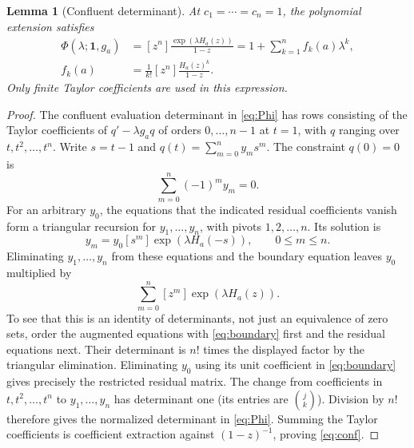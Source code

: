 \documentclass[11pt]{article}
\newtheorem{lemma}[theorem]{Lemma}
\theoremstyle{remark}\newtheorem{remark}[theorem]{Remark}
\newcommand{\coef}[2]{[#1^{#2}]}
\begin{document}
\begin{lemma}[Confluent determinant]\label{lem:confluent}
At $c_1=\cdots=c_n=1$, the polynomial extension satisfies
\begin{align}\label{eq:conf}
 \Phi(\lambda;\mathbf1,g_a)
 &=\coef{z}{n}\frac{\exp(\lambda H_a(z))}{1-z}
 =1+\sum_{k=1}^n f_k(a)\lambda^k,\\
 f_k(a)&=\frac1{k!}\coef{z}{n}\frac{H_a(z)^k}{1-z}.\nonumber
\end{align}
Only finite Taylor coefficients are used in this expression.
\end{lemma}
\begin{proof}
The confluent evaluation determinant in \eqref{eq:Phi} has rows consisting
of the Taylor coefficients of $q'-\lambda g_aq$ of orders $0,\ldots,n-1$
at $t=1$, with $q$ ranging over $t,t^2,\ldots,t^n$.
Write $s=t-1$ and $q(t)=\sum_{m=0}^n y_ms^m$. The constraint $q(0)=0$ is
\begin{equation}\label{eq:boundary}
 \sum_{m=0}^n(-1)^m y_m=0.
\end{equation}
For an arbitrary $y_0$, the equations that the indicated residual coefficients
vanish form a triangular recursion for $y_1,\ldots,y_n$, with pivots
$1,2,\ldots,n$. Its solution is
\[
 y_m=y_0\coef{s}{m}\exp(\lambda H_a(-s)),\qquad 0\le m\le n.
\]
Eliminating $y_1,\ldots,y_n$ from these equations and the boundary equation
leaves $y_0$ multiplied by
\[
 \sum_{m=0}^n\coef{z}{m}\exp(\lambda H_a(z)).
\]
To see that this is an identity of determinants, not just an equivalence of
zero sets, order the augmented equations with \eqref{eq:boundary} first and
the residual equations next. Their determinant is $n!$ times the displayed
factor by the triangular elimination. Eliminating $y_0$ using its unit
coefficient in \eqref{eq:boundary} gives precisely the restricted residual
matrix. The change from coefficients in $t,t^2,\ldots,t^n$ to
$y_1,\ldots,y_n$ has determinant one (its entries are $\binom jk$).
Division by $n!$ therefore gives the normalized determinant in
\eqref{eq:Phi}. Summing the Taylor coefficients is coefficient extraction
against $(1-z)^{-1}$, proving \eqref{eq:conf}.
\end{proof}
\end{document}
